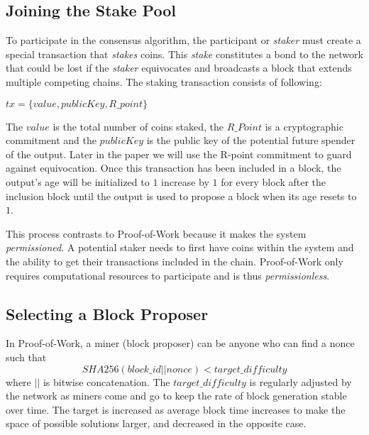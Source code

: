 \documentclass{article}
\begin{document}
\subsection{Joining the Stake Pool}

To participate in the consensus algorithm, the participant or \textit{staker} must create a special transaction that \textit{stakes} coins. This \textit{stake} constitutes a bond to the network that could be lost if the \textit{staker} equivocates and broadcasts a block that extends multiple competing chains. The staking transaction consists of following:
\begin{center}
$tx = \{value, publicKey, R\_point\}$
\end{center}
The $value$ is the total number of coins staked, the $R\_Point$ is a cryptographic commitment and the $publicKey$ is the public key of the potential future spender of the output. Later in the paper we will use the R-point commitment to guard against equivocation. Once this transaction has been included in a block, the output's age will be initialized to $ 1 $ increase by $ 1 $ for every block after the inclusion block until the output is used to propose a block when its age resets to $ 1 $.

This process contrasts to Proof-of-Work because it makes the system \textit{permissioned}. A potential staker needs to first have coins within the system and the ability to get their transactions included in the chain. Proof-of-Work only requires computational resources to participate and is thus \textit{permissionless}.

\subsection{Selecting a Block Proposer}
In Proof-of-Work, a miner (block proposer) can be anyone who can find a nonce such that 
$$SHA256(block\_id || nonce) < target\_difficulty$$
where $||$ is bitwise concatenation. The $target\_difficulty$ is regularly adjusted by the network as miners come and go to keep the rate of block generation stable over time. The target is increased as average block time increases to make the space of possible solutions larger, and decreased in the opposite case.
\end{document}
